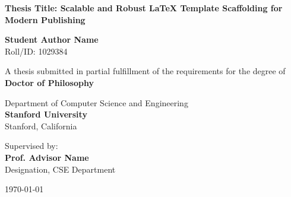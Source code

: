 \begin{titlepage}
\begin{center}
    \vspace*{1cm}
    
    
    \vspace{1.5cm}
    
    {\huge \bfseries \color{primary} Thesis Title: Scalable and Robust LaTeX Template Scaffolding for Modern Publishing}
    
    \vspace{1.5cm}
    
    {\Large \bfseries Student Author Name} \\
    \vspace{0.2cm}
    {Roll/ID: 1029384}
    
    \vspace{1.5cm}
    
    {A thesis submitted in partial fulfillment of the requirements for the degree of} \\
    \vspace{0.3cm}
    {\large \bfseries \color{secondary} Doctor of Philosophy}
    
    \vspace{1.5cm}
    
    {\large Department of Computer Science and Engineering} \\
    \vspace{0.2cm}
    {\large \bfseries \color{primary} Stanford University} \\
    \vspace{0.1cm}
    {Stanford, California}
    
    \vfill
    
    {Supervised by:} \\
    {\large \bfseries Prof. Advisor Name} \\
    {Designation, CSE Department}
    
    \vspace{1cm}
    
    {\large \today}
    
\end{center}
\end{titlepage}
